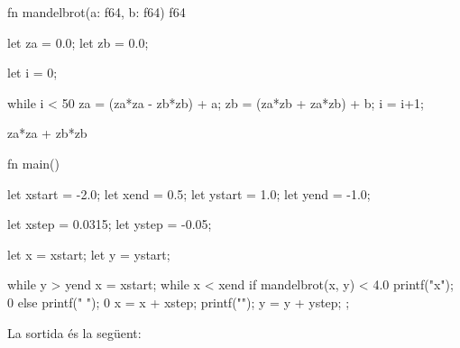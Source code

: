 ﻿\documentclass{article}
\begin{document}
\begin{code}
fn mandelbrot(a: f64, b: f64) f64 {
    let za = 0.0;
    let zb = 0.0;

    let i = 0;

    while i < 50 {
        za = (za*za - zb*zb) + a;
        zb = (za*zb + za*zb) + b;
        i = i+1;
    }

    za*za + zb*zb
}

fn main() {
    let xstart = -2.0;
    let xend = 0.5;
    let ystart = 1.0;
    let yend = -1.0;

    let xstep = 0.0315;
    let ystep = -0.05;

    let x = xstart;
    let y = ystart;

    while y > yend {
        x = xstart;
        while x < xend {
            if mandelbrot(x, y) < 4.0 {
                printf("x");
                0
            } else {
                printf(" ");
                0
            }
            x = x + xstep; 
        }
        printf("\n");
        y = y + ystep; 
    };
}
\end{code}

La sortida és la següent:
\end{document}
